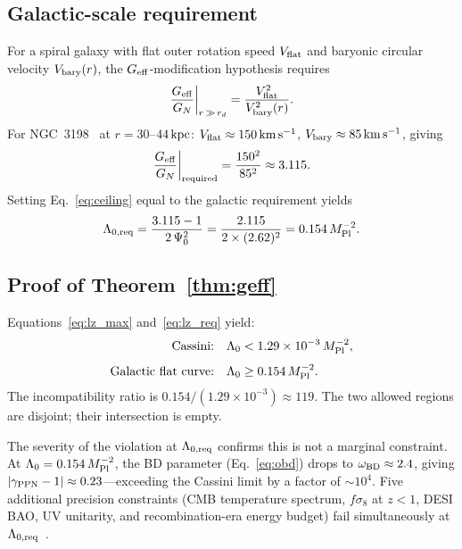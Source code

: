 \documentclass[12pt,a4paper]{article}
\theoremstyle{plain}
\newcommand{\Mpl}{M_{\rm Pl}}
\newcommand{\Geff}{G_{\rm eff}}
\newcommand{\GN}{G_N}
\newcommand{\obd}{\omega_{\rm BD}}
\newcommand{\Vbary}{V_{\rm bary}}
\newcommand{\Vflat}{V_{\rm flat}}
\begin{document}
\subsection{Galactic-scale requirement}
\label{sec:geff_galactic}

For a spiral galaxy with flat outer rotation speed $\Vflat$ and baryonic
circular velocity $\Vbary(r)$, the $\Geff$-modification hypothesis
requires~\cite{FamaeyMcGaugh2012}
\begin{equation}
  \frac{\Geff}{\GN}\bigg|_{r\,\gg\,r_d}
    = \frac{V_{\rm flat}^2}{\Vbary^2(r)}.
  \label{eq:galactic_req}
\end{equation}
For NGC~3198~\cite{Lelli2016} at $r = 30$--$44\,{\rm kpc}$:
$\Vflat \approx 150\,{\rm km\,s^{-1}}$, $\Vbary \approx 85\,
{\rm km\,s^{-1}}$, giving
\begin{equation}
  \frac{\Geff}{\GN}\bigg|_{\rm required}
    = \frac{150^2}{85^2} \approx 3.115.
  \label{eq:geff_req}
\end{equation}
Setting Eq.~\eqref{eq:ceiling} equal to the galactic requirement yields
\begin{equation}
  \Lambda_{0,{\rm req}} = \frac{3.115-1}{2\,\Psi_0^2}
    = \frac{2.115}{2\times(2.62)^2} = 0.154\,\Mpl^{-2}.
  \label{eq:lz_req}
\end{equation}

\subsection{Proof of Theorem~\ref{thm:geff}}
\label{sec:geff_proof}

Equations~\eqref{eq:lz_max} and~\eqref{eq:lz_req} yield:
\begin{align}
  \text{Cassini:}\quad
    & \Lambda_0 < 1.29\times10^{-3}\,\Mpl^{-2},
    \label{eq:cassini_bound}\\[4pt]
  \text{Galactic flat curve:}\quad
    & \Lambda_0 \geq 0.154\,\Mpl^{-2}.
    \label{eq:galactic_bound}
\end{align}
The incompatibility ratio is $0.154/(1.29\times10^{-3}) \approx 119$.
The two allowed regions are disjoint; their intersection is empty.

The severity of the violation at $\Lambda_{0,{\rm req}}$ confirms this is
not a marginal constraint.  At $\Lambda_0 = 0.154\,\Mpl^{-2}$, the BD
parameter (Eq.~\eqref{eq:obd}) drops to $\obd \approx 2.4$, giving
$|\gamma_{\rm PPN} - 1| \approx 0.23$---exceeding the Cassini limit by a
factor of $\sim\!10^4$.  Five additional precision constraints (CMB
temperature spectrum, $f\sigma_8$ at $z < 1$, DESI BAO, UV unitarity, and
recombination-era energy budget) fail simultaneously at
$\Lambda_{0,{\rm req}}$~\cite{WilsonPaperIV}.
\end{document}
